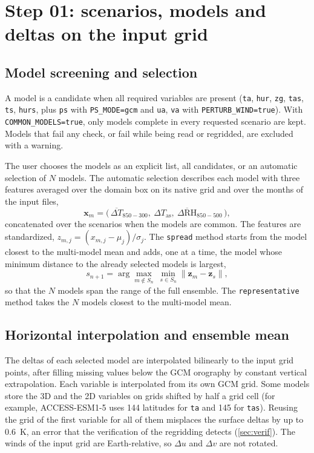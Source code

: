 \documentclass[11pt,a4paper]{article}
\newcommand{\code}[1]{\texttt{#1}}
\newcommand{\dT}{\Delta T}
\newcommand{\dRH}{\Delta \mathrm{RH}}
\begin{document}
\section{Step 01: scenarios, models and deltas on the input grid}
\label{sec:step01}

\subsection{Model screening and selection}

A model is a candidate when all required variables are present (\code{ta},
\code{hur}, \code{zg}, \code{tas}, \code{ts}, \code{hurs}, plus \code{ps} with
\code{PS\_MODE=gcm} and \code{ua}, \code{va} with \code{PERTURB\_WIND=true}).
With \code{COMMON\_MODELS=true}, only models complete in every requested
scenario are kept. Models that fail any check, or fail while being read or
regridded, are excluded with a warning.

The user chooses the models as an explicit list, all candidates, or an
automatic selection of $N$ models. The automatic selection describes each
model with three features averaged over the domain box on its native grid and
over the months of the input files,
\begin{equation}
  \mathbf{x}_m = \bigl(\, \overline{\dT}_{850-300},\ \Delta T_{\mathrm{as}},\
  \overline{\dRH}_{850-500} \,\bigr),
\end{equation}
concatenated over the scenarios when the models are common. The features are
standardized, $z_{m,j} = (x_{m,j}-\mu_j)/\sigma_j$. The \code{spread} method
starts from the model closest to the multi-model mean and adds, one at a
time, the model whose minimum distance to the already selected models is
largest,
\begin{equation}
  s_{n+1} = \arg\max_{m \notin S_n}\ \min_{s \in S_n} \lVert \mathbf{z}_m - \mathbf{z}_s \rVert ,
\end{equation}
so that the $N$ models span the range of the full ensemble. The
\code{representative} method takes the $N$ models closest to the multi-model
mean.

\subsection{Horizontal interpolation and ensemble mean}

The deltas of each selected model are interpolated bilinearly to the input
grid points, after filling missing values below the GCM orography by constant
vertical extrapolation. Each variable is interpolated from its own GCM grid.
Some models store the 3D and the 2D variables on grids shifted by half a grid
cell (for example, ACCESS-ESM1-5 uses 144 latitudes for \code{ta} and 145 for
\code{tas}). Reusing the grid of the first variable for all of them misplaces
the surface deltas by up to \SI{0.6}{K}, an error that the verification of
the regridding detects (\cref{sec:verif}). The winds of the input grid are
Earth-relative, so $\Delta u$ and $\Delta v$ are not rotated.
\end{document}

